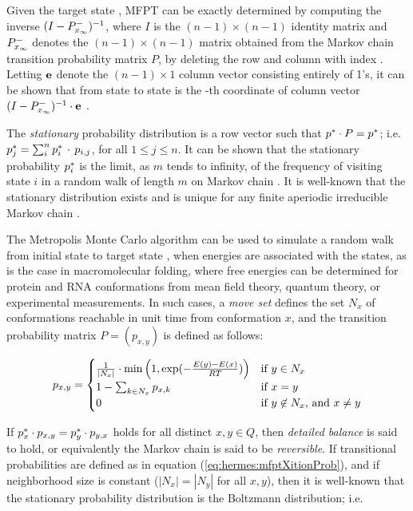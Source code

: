 Given the target state \xEnd, MFPT can be exactly
determined by computing the inverse
$(I - P^{-}_{x_\infty})^{-1}$, where $I$ is the $(n-1)\times (n-1)$ identity
matrix and $P^{-}_{x_\infty}$
denotes the $(n-1)\times (n-1)$ matrix obtained from the
Markov chain transition probability matrix $P$,
by deleting the row and column with index \xEnd.
Letting ${\bf e}$ denote the
$(n-1) \times 1$ column vector consisting entirely of 1's, it can be
shown that \mfpt from state \xStart to state \xEnd
is the \xStart-th coordinate
of column vector
$(I - P^{-}_{x_\infty})^{-1} \cdot {\bf e}$ \cite{meyermfpt}.

The {\em stationary} probability distribution \statDist
is a row vector such that $p^* \cdot P = p^*$; i.e.
$p^*_j = \sum_{i}^n p^*_i\, \cdot\, p_{i,j}$, for all $1\leq j \leq n$.
It can be shown that the stationary probability $p^*_i$ is the limit,
as $m$ tends to infinity, of the frequency of visiting state $i$ in a
random walk of length $m$ on Markov chain \mChain.
It is well-known that the stationary distribution exists and is unique
for any finite aperiodic irreducible Markov chain \cite{cloteBackofen:book}.

The Metropolis Monte Carlo algorithm \cite{metropolis:MonteCarlo} can
be used to simulate a random walk from initial state \xStart to target state
\xEnd, when energies are associated with the states, as is the case in
macromolecular folding, where free energies can be determined for
protein and RNA conformations from mean field theory, quantum theory,
or experimental measurements. In such cases, a {\em move set}
defines the set $N_x$ of conformations reachable in unit time
from conformation $x$, and the transition probability matrix
$P = (p_{x,y})$ is defined as follows:

\begin{align}
\label{eq:hermes:mfptXitionProb}
p_{x,y} =
\begin{cases}
\frac{1}{|N_x|} \cdot \min\left( 1, \boltzYmX \right)
& \text{if $y \in N_x$} \\
1 - \sum_{k \in N_x} p_{x,k} & \text{if $x=y$} \\
0 & \text{if $y \not\in N_x$, and $x \ne y$} \\
\end{cases}
\end{align}

If $p^*_x \cdot p_{x,y} = p^*_y \cdot p_{y,x}$ holds for all distinct
$x,y \in Q$, then
{\em detailed balance} is said to hold, or equivalently the Markov
chain \mChain is said to be {\em reversible}.
If transitional probabilities
are defined as in equation (\ref{eq:hermes:mfptXitionProb}), and if neighborhood
size is constant ($|N_x|=|N_y|$ for all $x,y$), then it is well-known
that the stationary probability distribution
\statDist is the Boltzmann distribution; i.e.

